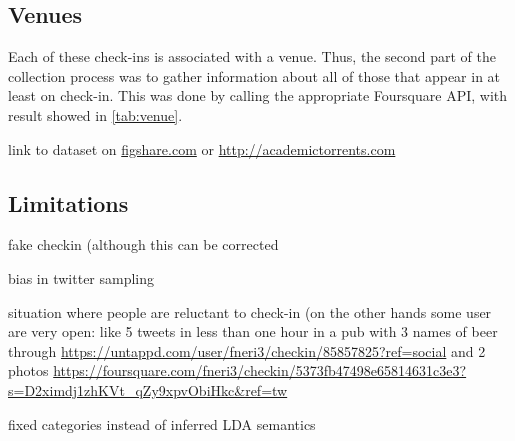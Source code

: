 \subsection{Venues}

Each of these check-ins is associated with a venue. Thus, the second part of
the collection process was to gather information about all of those
 that appear in at least on check-in. This was done by calling the
appropriate Foursquare API, with result showed in \autoref{tab:venue}.

link to dataset on
\href{http://figshare.com/authors/G\%C3\%A9raud\%20Le\%20Falher/542931}%
{\url{figshare.com}} or \url{http://academictorrents.com}

\subsection{Limitations}

fake checkin\autocite{FakeCheckins12} (although this can be corrected
\autocite{ValidateCheckin13,FindingFake14}

bias in twitter sampling\autocite{TwitterBias14}

situation where people are reluctant to check-in\autocite{Privacy11} (on the
other hands some user are very open: like 5 tweets in less than one hour in a
pub with 3 names of beer through
\url{https://untappd.com/user/fneri3/checkin/85857825?ref=social} and 2 photos
\url{https://foursquare.com/fneri3/checkin/5373fb47498e65814631c3e3?s=D2ximdj1zhKVt_qZy9xpvObiHkc&ref=tw}

fixed categories instead of inferred LDA semantics\autocite{PlaceSemantic14}

